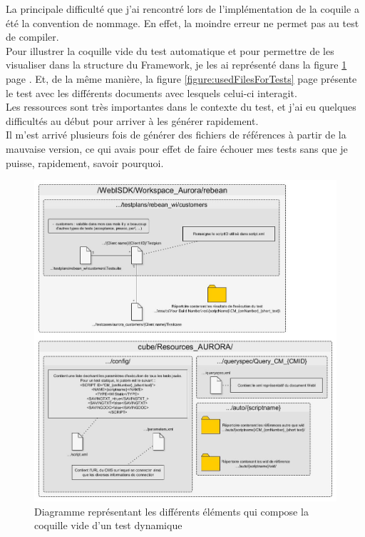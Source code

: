 La principale difficult\'{e} que j'ai rencontr\'{e} lors de l'impl\'{e}mentation de la coquile a \'{e}t\'{e} la convention de nommage. En effet, la moindre erreur ne permet pas au test de compiler.\\
Pour illustrer la coquille vide du test automatique et pour permettre de les visualiser dans la structure du \gls{Framework}, je les ai repr\'{e}sent\'{e} dans la figure \ref{figure:testEmptyShell} page \pageref{figure:testEmptyShell}. Et, de la m\^{e}me mani\`{e}re, la figure \ref{figure:usedFilesForTests} page \pageref{figure:usedFilesForTests} pr\'{e}sente le test avec les diff\'{e}rents documents avec lesquels celui-ci interagit.\\
Les ressources sont tr\`{e}s importantes dans le contexte du test, et j'ai eu quelques difficult\'{e}s au d\'{e}but pour arriver \`{a} les g\'{e}n\'{e}rer rapidement.\\
Il m'est arrivé plusieurs fois de g\'{e}n\'{e}rer des fichiers de r\'{e}f\'{e}rences \`{a} partir de la mauvaise version, ce qui avais pour effet de faire \'{e}chouer mes tests sans que je puisse, rapidement, savoir pourquoi.\\
\begin{figure}[H]
  \centering
      \includegraphics[width=\textwidth]{images/testEmptyShell.jpg}
  \caption{Diagramme repr\'{e}sentant les diff\'{e}rents \'{e}l\'{e}ments qui compose la coquille vide d'un test dynamique}
	\label{figure:testEmptyShell}
\end{figure}
